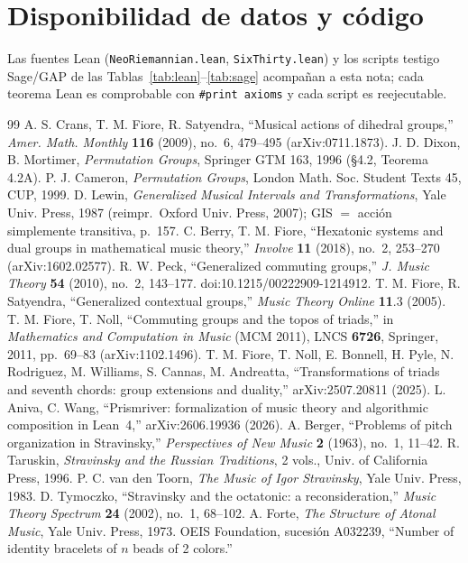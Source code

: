 \documentclass[11pt]{article}
\newcommand{\lean}[1]{\texttt{#1}}
\begin{document}
\section*{Disponibilidad de datos y código}
Las fuentes Lean (\lean{NeoRiemannian.lean}, \lean{SixThirty.lean}) y los scripts testigo Sage/GAP de las
Tablas~\ref{tab:lean}--\ref{tab:sage} acompañan a esta nota; cada teorema Lean es comprobable con
\lean{\#print axioms} y cada script es reejecutable.

\begin{thebibliography}{99}
 A. S. Crans, T. M. Fiore, R. Satyendra, ``Musical actions of dihedral groups,''
  \emph{Amer. Math. Monthly} \textbf{116} (2009), no.~6, 479--495 (arXiv:0711.1873).
 J. D. Dixon, B. Mortimer, \emph{Permutation Groups}, Springer GTM 163, 1996
  (\S4.2, Teorema 4.2A).
 P. J. Cameron, \emph{Permutation Groups}, London Math. Soc. Student Texts 45, CUP, 1999.
 D. Lewin, \emph{Generalized Musical Intervals and Transformations}, Yale Univ. Press,
  1987 (reimpr.\ Oxford Univ. Press, 2007); GIS $=$ acción simplemente transitiva, p.~157.
 C. Berry, T. M. Fiore, ``Hexatonic systems and dual groups in mathematical music theory,''
  \emph{Involve} \textbf{11} (2018), no.~2, 253--270 (arXiv:1602.02577).
 R. W. Peck, ``Generalized commuting groups,'' \emph{J. Music Theory} \textbf{54} (2010),
  no.~2, 143--177. doi:10.1215/00222909-1214912.
 T. M. Fiore, R. Satyendra, ``Generalized contextual groups,'' \emph{Music Theory Online}
  \textbf{11}.3 (2005).
 T. M. Fiore, T. Noll, ``Commuting groups and the topos of triads,'' in
  \emph{Mathematics and Computation in Music} (MCM 2011), LNCS \textbf{6726}, Springer, 2011, pp.~69--83
  (arXiv:1102.1496).
 T. M. Fiore, T. Noll, E. Bonnell, H. Pyle, N. Rodriguez, M. Williams, S. Cannas,
  M. Andreatta, ``Transformations of triads and seventh chords: group extensions and duality,''
  arXiv:2507.20811 (2025).
 L. Aniva, C. Wang, ``Prismriver: formalization of music theory and algorithmic
  composition in Lean~4,'' arXiv:2606.19936 (2026).
 A. Berger, ``Problems of pitch organization in Stravinsky,'' \emph{Perspectives of New
  Music} \textbf{2} (1963), no.~1, 11--42.
 R. Taruskin, \emph{Stravinsky and the Russian Traditions}, 2 vols., Univ. of
  California Press, 1996.
 P. C. van den Toorn, \emph{The Music of Igor Stravinsky}, Yale Univ. Press, 1983.
 D. Tymoczko, ``Stravinsky and the octatonic: a reconsideration,'' \emph{Music
  Theory Spectrum} \textbf{24} (2002), no.~1, 68--102.
 A. Forte, \emph{The Structure of Atonal Music}, Yale Univ. Press, 1973.
 OEIS Foundation, sucesión A032239, ``Number of identity bracelets of $n$ beads of 2
  colors.''
\end{thebibliography}
\end{document}
